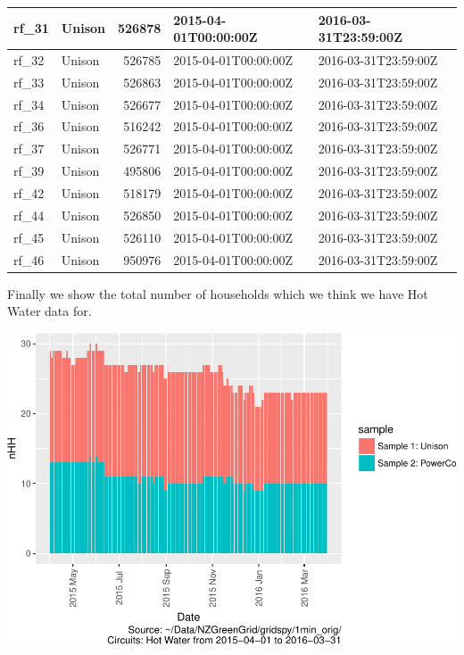 \documentclass[]{article}
\begin{document}
\begin{table}
\begin{tabular}[t]{l|l|r|l|l}
\hline
rf\_31 & Unison & 526878 & 2015-04-01T00:00:00Z & 2016-03-31T23:59:00Z\\
\hline
rf\_32 & Unison & 526785 & 2015-04-01T00:00:00Z & 2016-03-31T23:59:00Z\\
\hline
rf\_33 & Unison & 526863 & 2015-04-01T00:00:00Z & 2016-03-31T23:59:00Z\\
\hline
rf\_34 & Unison & 526677 & 2015-04-01T00:00:00Z & 2016-03-31T23:59:00Z\\
\hline
rf\_36 & Unison & 516242 & 2015-04-01T00:00:00Z & 2016-03-31T23:59:00Z\\
\hline
rf\_37 & Unison & 526771 & 2015-04-01T00:00:00Z & 2016-03-31T23:59:00Z\\
\hline
rf\_39 & Unison & 495806 & 2015-04-01T00:00:00Z & 2016-03-31T23:59:00Z\\
\hline
rf\_42 & Unison & 518179 & 2015-04-01T00:00:00Z & 2016-03-31T23:59:00Z\\
\hline
rf\_44 & Unison & 526850 & 2015-04-01T00:00:00Z & 2016-03-31T23:59:00Z\\
\hline
rf\_45 & Unison & 526110 & 2015-04-01T00:00:00Z & 2016-03-31T23:59:00Z\\
\hline
rf\_46 & Unison & 950976 & 2015-04-01T00:00:00Z & 2016-03-31T23:59:00Z\\
\hline
\end{tabular}
\end{table}

Finally we show the total number of households which we think we have
Hot Water data for.

\includegraphics{ggHotWaterProfiles_files/figure-latex/liveDataHouseholds-1.pdf}
\end{document}
